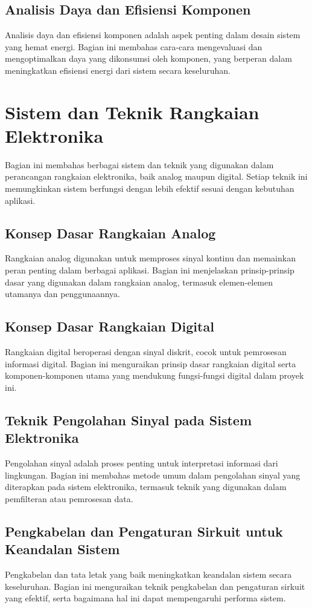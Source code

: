 \subsection{Analisis Daya dan Efisiensi Komponen}
Analisis daya dan efisiensi komponen adalah aspek penting dalam desain sistem yang hemat energi. Bagian ini membahas cara-cara mengevaluasi dan mengoptimalkan daya yang dikonsumsi oleh komponen, yang berperan dalam meningkatkan efisiensi energi dari sistem secara keseluruhan.

\section{Sistem dan Teknik Rangkaian Elektronika}
Bagian ini membahas berbagai sistem dan teknik yang digunakan dalam perancangan rangkaian elektronika, baik analog maupun digital. Setiap teknik ini memungkinkan sistem berfungsi dengan lebih efektif sesuai dengan kebutuhan aplikasi.

\subsection{Konsep Dasar Rangkaian Analog}
Rangkaian analog digunakan untuk memproses sinyal kontinu dan memainkan peran penting dalam berbagai aplikasi. Bagian ini menjelaskan prinsip-prinsip dasar yang digunakan dalam rangkaian analog, termasuk elemen-elemen utamanya dan penggunaannya.

\subsection{Konsep Dasar Rangkaian Digital}
Rangkaian digital beroperasi dengan sinyal diskrit, cocok untuk pemrosesan informasi digital. Bagian ini menguraikan prinsip dasar rangkaian digital serta komponen-komponen utama yang mendukung fungsi-fungsi digital dalam proyek ini.

\subsection{Teknik Pengolahan Sinyal pada Sistem Elektronika}
Pengolahan sinyal adalah proses penting untuk interpretasi informasi dari lingkungan. Bagian ini membahas metode umum dalam pengolahan sinyal yang diterapkan pada sistem elektronika, termasuk teknik yang digunakan dalam pemfilteran atau pemrosesan data.

\subsection{Pengkabelan dan Pengaturan Sirkuit untuk Keandalan Sistem}
Pengkabelan dan tata letak yang baik meningkatkan keandalan sistem secara keseluruhan. Bagian ini menguraikan teknik pengkabelan dan pengaturan sirkuit yang efektif, serta bagaimana hal ini dapat mempengaruhi performa sistem.

